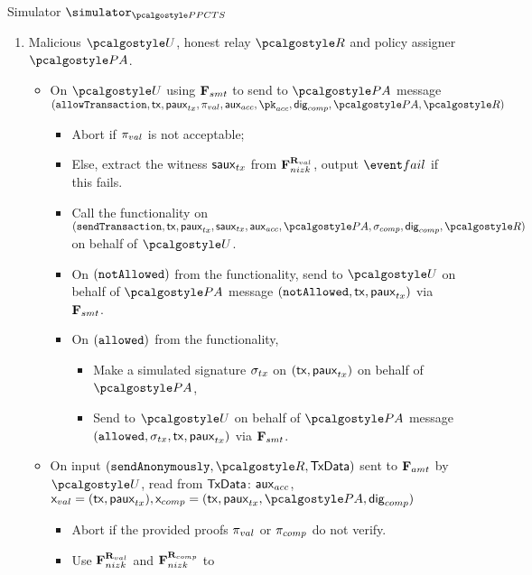 \documentclass[runningheads,10pt]{llncs}
\numberwithin{equation}{section}
\begin{document}
\begin{simbox}{Simulator $\simulator_{\PPCTS}$}
\begin{enumerate}
  \item Malicious $\user$, honest relay $\relay$ and policy assigner $\polas$.
    \begin{itemize}
      \item  On
    $\user$ using $\mathbf{F}_{{smt}}$ to send to $\polas$ message
    $(\allowTransaction, \tx, \paux_{tx}, \zkproof_{val}, \auxacc, \pkacc,
    \policydig, \polas, \relay)$ 
    \begin{itemize}
      \item Abort if $\mathsf{\pi}_{val}$ is not acceptable;
      \item Else, extract the witness $\mathsf{saux}_{tx}$ from $\mathbf{F}_{{nizk}}^{\mathbf{R}_{val}}$,
        output $\fail$ if this fails.
      \item Call the functionality on
        $(\sendTransaction, \tx, \paux_{tx}, \saux_{tx}, \auxacc, \polas,
        \signature_{comp}, \policydig,
        \relay)$ on behalf of $\user$.
      \item On $(\mathtt{notAllowed})$ from the functionality, send to $\user$ on
        behalf of $\polas$ message $(\mathtt{notAllowed}, \mathsf{tx}, \mathsf{paux}_{tx})$ via
        $\mathbf{F}_{{smt}}$. 
      \item On $(\mathtt{allowed})$ from the functionality,
        \begin{itemize}
        \item Make a simulated signature $\sigma_{tx}$ on $(\mathsf{tx}, \mathsf{paux}_{tx})$
          on behalf of $\polas$,
        \item Send to $\user$ on behalf of $\polas$ message $(\mathtt{allowed},
          \sigma_{tx}, \mathsf{tx}, \mathsf{paux}_{tx})$ via $\mathbf{F}_{{smt}}$. 
        \end{itemize}
      \end{itemize}
    \item On input $(\sendAnonymously, \relay, \txdata)$ sent to $\mathbf{F}_{{amt}}$
      by $\user$, read from $\mathsf{TxData}$: $\mathsf{aux}_{acc}$, $\inp_{val} = (\tx,
      \paux_{tx}), \inp_{comp} = (\tx, \paux_{tx}, \polas, \policydig)$
    \begin{itemize}
      \item Abort if the provided proofs $\mathsf{\pi}_{val}$ or $\mathsf{\pi}_{comp}$
        do not verify.
      \item  Use $\mathbf{F}_{{nizk}}^{\mathbf{R}_{val}}$ and $\mathbf{F}_{{nizk}}^{\mathbf{R}_{comp}}$ to

\end{itemize}
\end{itemize}
\end{enumerate}
\end{simbox}
\end{document}
